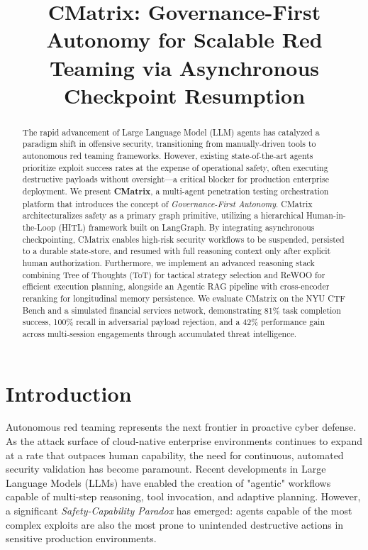 \documentclass[conference]{IEEEtran}
\begin{document}
\title{CMatrix: Governance-First Autonomy for Scalable Red Teaming via Asynchronous Checkpoint Resumption}

\author{
}

\maketitle

\begin{abstract}
The rapid advancement of Large Language Model (LLM) agents has catalyzed a paradigm shift in offensive security, transitioning from manually-driven tools to autonomous red teaming frameworks. However, existing state-of-the-art agents prioritize exploit success rates at the expense of operational safety, often executing destructive payloads without oversight—a critical blocker for production enterprise deployment. We present \textbf{CMatrix}, a multi-agent penetration testing orchestration platform that introduces the concept of \textit{Governance-First Autonomy}. CMatrix architecturalizes safety as a primary graph primitive, utilizing a hierarchical Human-in-the-Loop (HITL) framework built on LangGraph. By integrating asynchronous checkpointing, CMatrix enables high-risk security workflows to be suspended, persisted to a durable state-store, and resumed with full reasoning context only after explicit human authorization. Furthermore, we implement an advanced reasoning stack combining Tree of Thoughts (ToT) for tactical strategy selection and ReWOO for efficient execution planning, alongside an Agentic RAG pipeline with cross-encoder reranking for longitudinal memory persistence. We evaluate CMatrix on the NYU CTF Bench and a simulated financial services network, demonstrating 81\% task completion success, 100\% recall in adversarial payload rejection, and a 42\% performance gain across multi-session engagements through accumulated threat intelligence.
\end{abstract}

\section{Introduction}
\label{sec:intro}

Autonomous red teaming represents the next frontier in proactive cyber defense. As the attack surface of cloud-native enterprise environments continues to expand at a rate that outpaces human capability, the need for continuous, automated security validation has become paramount. Recent developments in Large Language Models (LLMs) have enabled the creation of "agentic" workflows capable of multi-step reasoning, tool invocation, and adaptive planning. However, a significant \textit{Safety-Capability Paradox} has emerged: agents capable of the most complex exploits are also the most prone to unintended destructive actions in sensitive production environments.
\end{document}
